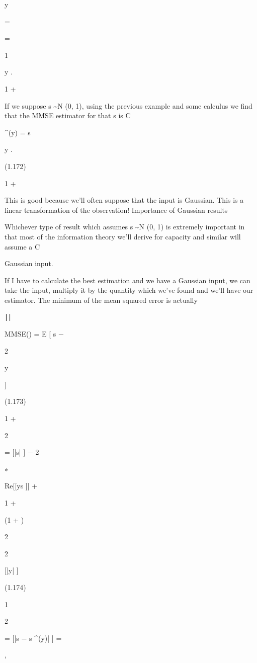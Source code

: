 {y

=

\sqrt{\rho}

=

1

y .

1 + \rho

If we suppose s \sim N (0, 1), using the previous example and some calculus we find that the MMSE estimator for that s is C

^(y) =
s

\sqrt{\rho}

y .

(1.172)

1 + \rho

This is good because we'll often suppose that the input is Gaussian.
This is a linear transformation of the observation!
​Importance of Gaussian results

Whichever type of result which assumes s \sim N (0, 1) is extremely important in that most of the information theory we'll derive for capacity and similar will assume a C

Gaussian input.

If I have to calculate the best estimation and we have a Gaussian input, we can take the input, multiply it by the quantity which we've found and we'll have our estimator.
The minimum of the mean squared error is actually

∣∣
\sqrt{\rho}

MMSE(\rho) = E [ s −

2

y

]

(1.173)

1 + \rho

\sqrt{\rho}

2

= [|s| ] − 2

\rho

∗

Re[[ys ]] +

1 + \rho

(1 + \rho)

2

2

[|y| ]

(1.174)

1

2

= [|s − s
^(y)| ] =

,

}
